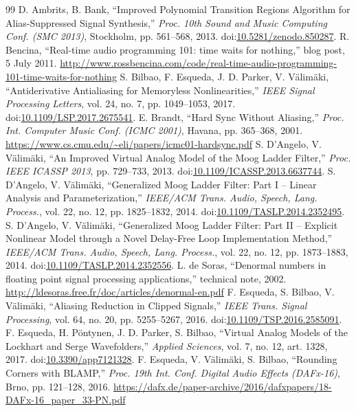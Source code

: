 \documentclass[conference]{IEEEtran}
\begin{document}
\begin{thebibliography}{99}
 D. Ambrits, B. Bank, ``Improved Polynomial Transition Regions Algorithm for Alias-Suppressed Signal Synthesis,'' \emph{Proc. 10th Sound and Music Computing Conf. (SMC 2013)}, Stockholm, pp. 561–568, 2013. doi:\href{https://doi.org/10.5281/zenodo.850287}{10.5281/zenodo.850287}.
 R. Bencina, ``Real-time audio programming 101: time waits for nothing,'' blog post, 5 July 2011. \url{http://www.rossbencina.com/code/real-time-audio-programming-101-time-waits-for-nothing}
 S. Bilbao, F. Esqueda, J. D. Parker, V. Välimäki, ``Antiderivative Antialiasing for Memoryless Nonlinearities,'' \emph{IEEE Signal Processing Letters}, vol. 24, no. 7, pp. 1049–1053, 2017. doi:\href{https://doi.org/10.1109/LSP.2017.2675541}{10.1109/LSP.2017.2675541}.
 E. Brandt, ``Hard Sync Without Aliasing,'' \emph{Proc. Int. Computer Music Conf. (ICMC 2001)}, Havana, pp. 365–368, 2001. \url{https://www.cs.cmu.edu/~eli/papers/icmc01-hardsync.pdf}
 S. D'Angelo, V. Välimäki, ``An Improved Virtual Analog Model of the Moog Ladder Filter,'' \emph{Proc. IEEE ICASSP 2013}, pp. 729–733, 2013. doi:\href{https://doi.org/10.1109/ICASSP.2013.6637744}{10.1109/ICASSP.2013.6637744}.
 S. D'Angelo, V. Välimäki, ``Generalized Moog Ladder Filter: Part I – Linear Analysis and Parameterization,'' \emph{IEEE/ACM Trans. Audio, Speech, Lang. Process.}, vol. 22, no. 12, pp. 1825–1832, 2014. doi:\href{https://doi.org/10.1109/TASLP.2014.2352495}{10.1109/TASLP.2014.2352495}.
 S. D'Angelo, V. Välimäki, ``Generalized Moog Ladder Filter: Part II – Explicit Nonlinear Model through a Novel Delay-Free Loop Implementation Method,'' \emph{IEEE/ACM Trans. Audio, Speech, Lang. Process.}, vol. 22, no. 12, pp. 1873–1883, 2014. doi:\href{https://doi.org/10.1109/TASLP.2014.2352556}{10.1109/TASLP.2014.2352556}.
 L. de Soras, ``Denormal numbers in floating point signal processing applications,'' technical note, 2002. \url{http://ldesoras.free.fr/doc/articles/denormal-en.pdf}
 F. Esqueda, S. Bilbao, V. Välimäki, ``Aliasing Reduction in Clipped Signals,'' \emph{IEEE Trans. Signal Processing}, vol. 64, no. 20, pp. 5255–5267, 2016. doi:\href{https://doi.org/10.1109/TSP.2016.2585091}{10.1109/TSP.2016.2585091}.
 F. Esqueda, H. Pöntynen, J. D. Parker, S. Bilbao, ``Virtual Analog Models of the Lockhart and Serge Wavefolders,'' \emph{Applied Sciences}, vol. 7, no. 12, art. 1328, 2017. doi:\href{https://doi.org/10.3390/app7121328}{10.3390/app7121328}.
 F. Esqueda, V. Välimäki, S. Bilbao, ``Rounding Corners with BLAMP,'' \emph{Proc. 19th Int. Conf. Digital Audio Effects (DAFx-16)}, Brno, pp. 121–128, 2016. \url{https://dafx.de/paper-archive/2016/dafxpapers/18-DAFx-16_paper_33-PN.pdf}

\end{thebibliography}
\end{document}
